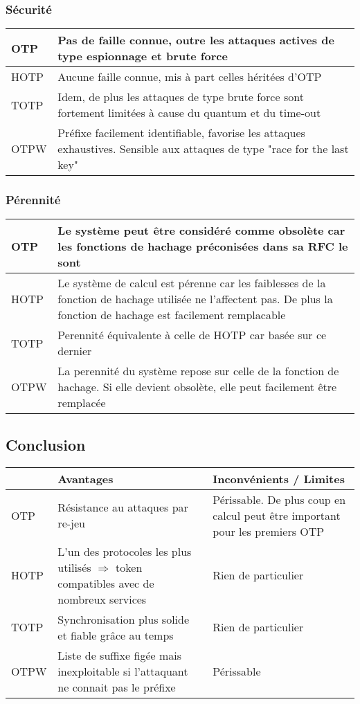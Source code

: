 \subsubsection{Sécurité}

	\begin{tabular}{| p{3cm} | p{12cm} |}
		\hline
		OTP & Pas de faille connue, outre les attaques actives de type
		espionnage et brute force \\
		\hline
		HOTP & Aucune faille connue, mis à part celles héritées d'OTP \\
		\hline
		TOTP & Idem, de plus les attaques de type brute force sont fortement
		limitées à cause du quantum et du time-out \\
		\hline
		OTPW & Préfixe facilement identifiable, favorise les attaques
		exhaustives. Sensible aux attaques de type "race for the last key" \\
		\hline
	\end{tabular}

\subsubsection{Pérennité}

	\begin{tabular}{| p{3cm} | p{12cm} |}
		\hline
		OTP & Le système peut être considéré comme obsolète car les fonctions
		de hachage préconisées dans sa RFC le sont \\
		\hline
		HOTP & Le système de calcul est	pérenne car les faiblesses de la
		fonction de hachage utilisée ne l'affectent pas. De plus la fonction
		de hachage est facilement remplacable \\
		\hline
		TOTP & Perennité équivalente à celle de HOTP car basée sur ce dernier
		\\
		\hline
		OTPW & La perennité du système repose sur celle de la fonction de
		hachage. Si elle devient obsolète, elle peut facilement être remplacée
		\\
		\hline
	\end{tabular}

\subsection{Conclusion}

	\begin{tabular}{| p{3cm} | p{6cm} | p{6cm} |}
		\hline
		& \cellcolor{gray} Avantages & \cellcolor{gray} Inconvénients /
		Limites \\
		\hline
		OTP & Résistance au attaques par re-jeu & Périssable. De plus coup en
		calcul peut être important pour les premiers OTP \\
		\hline
		HOTP & L'un des protocoles les plus utilisés $\Rightarrow$ token
		compatibles avec de nombreux services & Rien de particulier \\
		\hline
		TOTP & Synchronisation plus solide et fiable grâce au temps & Rien de
		particulier \\
		\hline
		OTPW & Liste de suffixe figée mais inexploitable si l'attaquant ne
		connait pas le préfixe & Périssable \\
		\hline
	\end{tabular}


